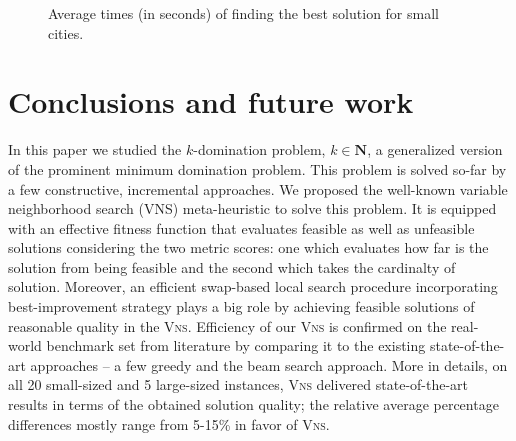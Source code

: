 \documentclass[dvipsnames,format=sigconf,anonymous=true,review=true]{acmart}
\begin{document}
\begin{figure}
	\caption{Average times (in seconds) of finding the best solution for small cities.}
	\label{fig:timeSmall}  
\end{figure}


 
\section{Conclusions and future work}

 
 In this paper we studied the $k$-domination problem, $k \in \mathbf{N}$,  a generalized version of the prominent minimum domination problem. This problem is solved so-far by a few constructive, incremental approaches. We proposed the well-known variable neighborhood search (VNS) meta-heuristic to solve this problem. It is equipped with an effective fitness function that evaluates feasible as well as unfeasible solutions considering the two metric scores: one which evaluates how far is the solution from being feasible and the second which takes the cardinalty of   solution.  Moreover, an efficient swap-based local search procedure incorporating best-improvement strategy plays a big role by achieving feasible solutions of reasonable quality in the \textsc{Vns}.  Efficiency of our \textsc{Vns} is confirmed on the real-world benchmark set from literature by comparing it to the existing state-of-the-art approaches -- a few greedy and the beam search approach. More in details, on all 20 small-sized and 5 large-sized instances, \textsc{Vns} delivered state-of-the-art results in terms of the obtained solution quality; the relative average percentage differences mostly range from 5-15\% in favor of \textsc{Vns}. 
 
\end{document}
